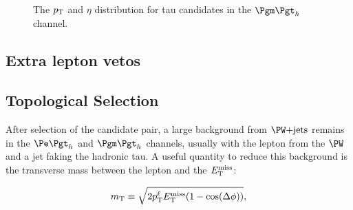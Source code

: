 \begin{figure}[htb]
\begin{center}

\end{center}
\caption{
The $p_{\mathrm{T}}$ and $\eta$ distribution for tau candidates in the $\mutau$
channel.
}
\label{fig:mutautaus}
\end{figure}



\subsection{Extra lepton vetos}

\subsection{Topological Selection}

After selection of the candidate pair, a large background from $\WJets$ remains
in the $\etau$ and $\mutau$ channels, usually with the lepton from the $\PW$ and
a jet faking the hadronic tau. A useful quantity to reduce this background is
the transverse mass between the lepton and the $E_{\mathrm{T}}^{\text{miss}}$:

\begin{equation}
m_{\text{T}}\equiv\sqrt{2p_{\mathrm{T}}^{\ell}E_{\mathrm{T}}^{\text{miss}}(1-\cos(\Delta\phi))},
\end{equation}

